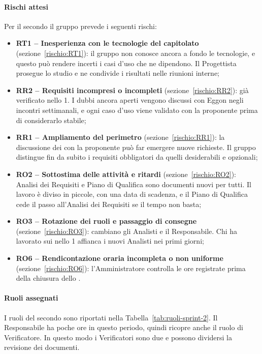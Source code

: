 \documentclass[documento]{gpt}
\newcommand{\subsubsubsection}[1]{\paragraph{#1}}
\begin{document}
\subsubsubsection{Rischi attesi}
Per il secondo  il gruppo prevede i seguenti rischi:
\begin{itemize}
  \item \textbf{RT1 -- Inesperienza con le tecnologie del capitolato}
        (sezione~\ref{rischio:RT1}): il gruppo non conosce ancora a fondo
        le tecnologie, e questo può rendere incerti i casi d'uso che ne
        dipendono. Il Progettista prosegue lo studio e ne condivide i
        risultati nelle riunioni interne;
  \item \textbf{RR2 -- Requisiti incompresi o incompleti}
        (sezione~\ref{rischio:RR2}): già verificato nello
         1. I dubbi ancora aperti vengono
        discussi con Eggon negli incontri settimanali, e ogni caso d'uso
        viene validato con la proponente prima di considerarlo stabile;
  \item \textbf{RR1 -- Ampliamento del perimetro}
        (sezione~\ref{rischio:RR1}): la discussione dei
         con la proponente può far emergere nuove
        richieste. Il gruppo distingue fin da subito i requisiti
        obbligatori da quelli desiderabili e opzionali;
  \item \textbf{RO2 -- Sottostima delle attività e ritardi}
        (sezione~\ref{rischio:RO2}): Analisi dei Requisiti e Piano di
        Qualifica sono documenti nuovi per tutti. Il lavoro è diviso in
         piccole, con una data di scadenza, e il
        Piano di Qualifica cede il passo all'Analisi dei Requisiti se il
        tempo non basta;
  \item \textbf{RO3 -- Rotazione dei ruoli e passaggio di consegne}
        (sezione~\ref{rischio:RO3}): cambiano gli Analisti e il
        Responsabile. Chi ha lavorato sui  nello
         1 affianca i nuovi Analisti nei primi
        giorni;
  \item \textbf{RO6 -- Rendicontazione oraria incompleta o non uniforme}
        (sezione~\ref{rischio:RO6}): l'Amministratore controlla le ore
        registrate prima della chiusura dello .
\end{itemize}

\subsubsubsection{Ruoli assegnati}
I ruoli del secondo  sono riportati nella
Tabella~\ref{tab:ruoli-sprint-2}. Il Responsabile ha poche ore in questo
periodo, quindi  ricopre anche il ruolo di Verificatore. In
questo modo i Verificatori sono due e possono dividersi la revisione dei
documenti.
\end{document}
